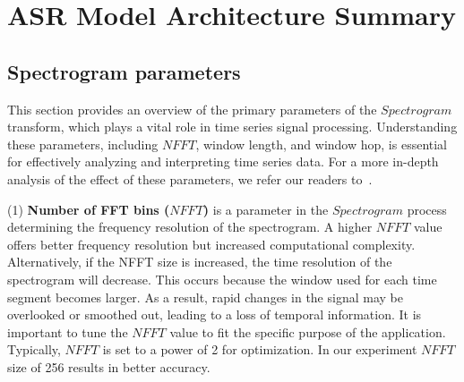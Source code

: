

\section{ASR Model Architecture Summary}
\label{appendix:models}
\subsection{Spectrogram parameters}
This section provides an overview of the primary parameters of the $Spectrogram$ transform, which plays a vital role in time series signal processing. Understanding these parameters, including $NFFT$, window length, and window hop, is essential for effectively analyzing and interpreting time series data. For a more in-depth analysis of the effect of these parameters, we refer our readers to~\cite{spectrogramnfft}.

(1) \textbf{Number of FFT bins ($NFFT$)} is a parameter in the $Spectrogram$ process determining the frequency resolution of the spectrogram. A higher $NFFT$ value offers better frequency resolution but increased computational complexity. Alternatively, if the NFFT size is increased, the time resolution of the spectrogram will decrease. This occurs because the window used for each time segment becomes larger. As a result, rapid changes in the signal may be overlooked or smoothed out, leading to a loss of temporal information. It is important to tune the $NFFT$ value to fit the specific purpose of the application. Typically, $NFFT$ is set to a power of 2 for optimization. In our experiment $NFFT$ size of 256 results in better accuracy. 

